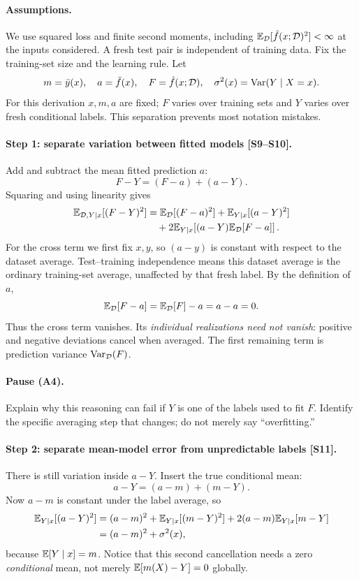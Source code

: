 \paragraph{Assumptions.} We use squared loss and finite second moments, including $\mathbb{E}_{\mathcal D}[\hat f(x;\mathcal D)^2]<\infty$ at the inputs considered. A fresh test pair is independent of training data. Fix the training-set size and the learning rule. Let
\[
m=\bar y(x),\quad a=\bar f(x),\quad F=\hat f(x;\mathcal D),\quad
\sigma^2(x)=\operatorname{Var}(Y\mid X=x).
\]
For this derivation $x,m,a$ are fixed; $F$ varies over training sets and $Y$ varies over fresh conditional labels. This separation prevents most notation mistakes.

\paragraph{Step 1: separate variation between fitted models [S9--S10].}
Add and subtract the mean fitted prediction $a$:
\[
F-Y=(F-a)+(a-Y).
\]
Squaring and using linearity gives
\begin{align}
\mathbb{E}_{\mathcal D,Y\mid x}[(F-Y)^2]
&=\mathbb{E}_{\mathcal D}[(F-a)^2]+\mathbb{E}_{Y\mid x}[(a-Y)^2]\notag\\
&\quad+2\mathbb{E}_{Y\mid x}\!\left[(a-Y)\mathbb{E}_{\mathcal D}[F-a]\right].
\label{eq:reg:first}
\end{align}
For the cross term we first fix $x,y$, so $(a-y)$ is constant with respect to the dataset average. Test--training independence means this dataset average is the ordinary training-set average, unaffected by that fresh label. By the definition of $a$,
\[
\mathbb{E}_{\mathcal D}[F-a]=\mathbb{E}_{\mathcal D}[F]-a=a-a=0.
\]
Thus the cross term vanishes. Its \emph{individual realizations need not vanish}: positive and negative deviations cancel when averaged. The first remaining term is prediction variance $\operatorname{Var}_{\mathcal D}(F)$.

\paragraph{Pause (A4).} Explain why this reasoning can fail if $Y$ is one of the labels used to fit $F$. Identify the specific averaging step that changes; do not merely say ``overfitting.''

\paragraph{Step 2: separate mean-model error from unpredictable labels [S11].}
There is still variation inside $a-Y$. Insert the true conditional mean:
\[
a-Y=(a-m)+(m-Y).
\]
Now $a-m$ is constant under the label average, so
\begin{align}
\mathbb{E}_{Y\mid x}[(a-Y)^2]
&=(a-m)^2+\mathbb{E}_{Y\mid x}[(m-Y)^2]
 +2(a-m)\mathbb{E}_{Y\mid x}[m-Y]\notag\\
&=(a-m)^2+\sigma^2(x),
\end{align}
because $\mathbb{E}[Y\mid x]=m$. Notice that this second cancellation needs a zero \emph{conditional} mean, not merely $\mathbb{E}[m(X)-Y]=0$ globally.

